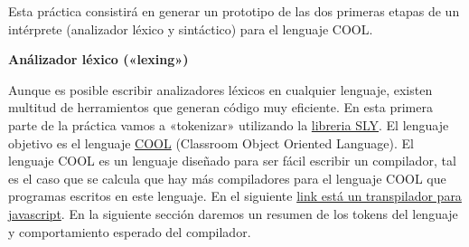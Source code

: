 \documentclass{article}
\newcounter{pregunta}
\newcommand\prop[1]%
{\addtocounter{pregunta}{1}
\noindent%
{\color{naranja_muy}\small\bf\thepregunta)}
\parbox[t]{.95\linewidth}{\it #1}}
\begin{document}
\shorthandoff{>}\shorthandoff{<}

Esta práctica consistirá en generar un prototipo de las dos primeras etapas de un intérprete (analizador léxico y sintáctico) para el lenguaje COOL.

\vspace{5mm}\centerline{\large\bf Análizador léxico («lexing»)}\vspace{5mm}
\label{sec:orgdbd8459}

%
%
%
%

Aunque es posible escribir analizadores léxicos en cualquier lenguaje, existen multitud de herramientos que generan código muy eficiente.  En esta primera parte de la práctica vamos a  «tokenizar» utilizando la  \href{https://sly.readthedocs.io/en/latest/sly.html}{libreria SLY}. El lenguaje objetivo es el lenguaje
\href{https://theory.stanford.edu/~aiken/software/cool/cool-manual.pdf}{COOL} (Classroom Object Oriented Language).
El lenguaje COOL es un lenguaje diseñado para ser fácil escribir un compilador, tal es el caso que se calcula que hay más compiladores para el lenguaje COOL que programas escritos en este lenguaje.
En el siguiente \href{https://nathanfriend.io/cooltojs/}{link está un transpilador para javascript}.
En la siguiente sección daremos un resumen de los tokens del lenguaje y comportamiento esperado del compilador.
\end{document}
